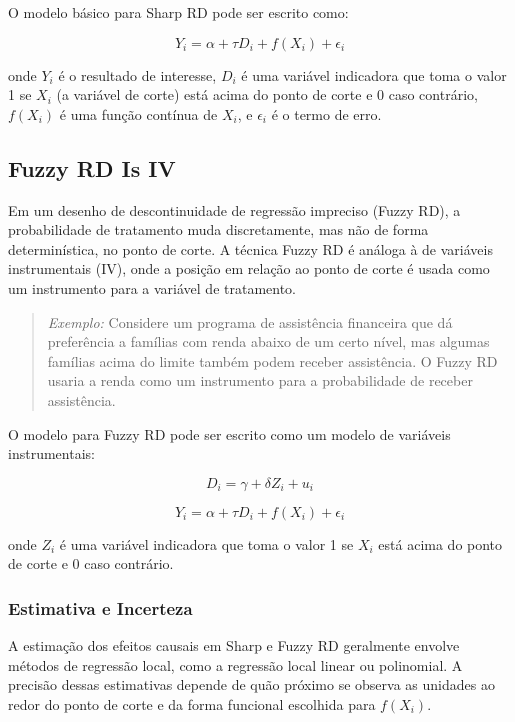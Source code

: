 \documentclass[a4paper,12pt]{article}[abntex2]
\begin{document}
O modelo básico para Sharp RD pode ser escrito como:

\begin{equation}
Y_i = \alpha + \tau D_i + f(X_i) + \epsilon_i
\end{equation}

onde \( Y_i \) é o resultado de interesse, \( D_i \) é uma variável indicadora que toma o valor 1 se \( X_i \) (a variável de corte) está acima do ponto de corte e 0 caso contrário, \( f(X_i) \) é uma função contínua de \( X_i \), e \( \epsilon_i \) é o termo de erro.

\subsection{Fuzzy RD Is IV}
Em um desenho de descontinuidade de regressão impreciso (Fuzzy RD), a probabilidade de tratamento muda discretamente, mas não de forma determinística, no ponto de corte. A técnica Fuzzy RD é análoga à de variáveis instrumentais (IV), onde a posição em relação ao ponto de corte é usada como um instrumento para a variável de tratamento.

\begin{quote}
\textit{Exemplo:} Considere um programa de assistência financeira que dá preferência a famílias com renda abaixo de um certo nível, mas algumas famílias acima do limite também podem receber assistência. O Fuzzy RD usaria a renda como um instrumento para a probabilidade de receber assistência.
\end{quote}

O modelo para Fuzzy RD pode ser escrito como um modelo de variáveis instrumentais:

\begin{equation}
D_i = \gamma + \delta Z_i + u_i
\end{equation}

\begin{equation}
Y_i = \alpha + \tau D_i + f(X_i) + \epsilon_i
\end{equation}

onde \( Z_i \) é uma variável indicadora que toma o valor 1 se \( X_i \) está acima do ponto de corte e 0 caso contrário.

\subsubsection{Estimativa e Incerteza}
A estimação dos efeitos causais em Sharp e Fuzzy RD geralmente envolve métodos de regressão local, como a regressão local linear ou polinomial. A precisão dessas estimativas depende de quão próximo se observa as unidades ao redor do ponto de corte e da forma funcional escolhida para \( f(X_i) \).
\end{document}
